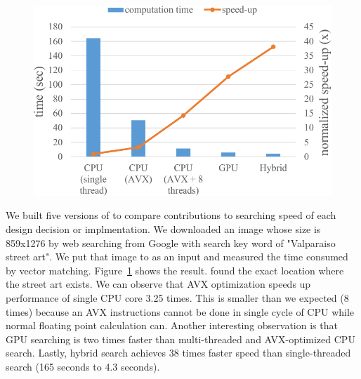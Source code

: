 \begin{figure}[t]
	\centering
	\includegraphics[scale=0.64]{figs/speed_up}
	\vspace{-0.1in}
	\vspace{-0.1in}
	\label{fig:speed_up}
\end{figure}

We built five versions of \name{} to compare contributions to searching speed of each design decision or implmentation.
We downloaded an image whose size is 859x1276 by web searching from Google with search key word of "Valparaiso street art".
We put that image to \name{} as an input and measured the time consumed by vector matching.
Figure~\ref{fig:speed_up} shows the result.
\name{} found the exact location where the street art exists.
We can observe that AVX optimization speeds up performance of single CPU core 3.25 times.
This is smaller than we expected (8 times) because an AVX instructions cannot be done in single cycle of CPU while normal floating point calculation can.
Another interesting observation is that GPU searching is two times faster than multi-threaded and AVX-optimized CPU search.
Lastly, hybrid search achieves 38 times faster speed than single-threaded search (165 seconds to 4.3 seconds).

